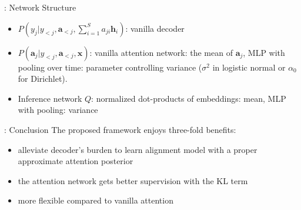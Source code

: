 \begin{frame}{\subsecname: Network Structure}
\begin{itemize}
    \item $P(y_j | y_{<j}, \mathbf{a}_{<j},\sum_{i=1}^S a_{ji} \mathbf{h}_i)$: vanilla decoder
    \item $P(\mathbf{a}_j | y_{<j}, \mathbf{a}_{<j},\mathbf{x})$: vanilla attention network: the mean of $\mathbf{a}_j$, MLP with pooling over time: parameter controlling variance ($\sigma^2$ in logistic normal or $\alpha_0$ for Dirichlet).
    \item Inference network $Q$: normalized dot-products of embeddings: mean, MLP with pooling: variance
\end{itemize}
\end{frame}

\begin{frame}{\subsecname: Conclusion}
The proposed framework enjoys three-fold benefits:
\begin{itemize}
    \item alleviate decoder's burden to learn alignment model with a proper approximate attention posterior
    \item the attention network gets better supervision with the KL term 
    \item more flexible compared to vanilla attention
\end{itemize}
\end{frame}